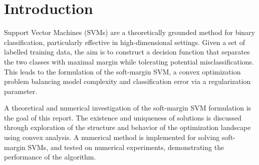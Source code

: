 \section{Introduction}\label{chap:introduction}
\vspace{-0.4cm}
Support Vector Machines (SVMs) are a theoretically grounded method
for binary classification, particularly effective in high-dimensional 
settings. Given a set of labelled training data, the aim is to 
construct a decision function that separates the two classes with 
maximal margin while tolerating potential misclassifications. This 
leads to the formulation of the soft-margin SVM, a convex 
optimization problem balancing model complexity and classification 
error via a regularization parameter.

A theoretical and numerical investigation of the soft-margin SVM formulation is the goal of this report. 
The existence and uniqueness of solutions is discussed through exploration of the structure and 
behavior of the optimization landscape using convex analysis.
A numerical method is implemented for solving soft-margin SVMs,
and tested on numerical experiments, demonstrating the performance of 
the algorithm.